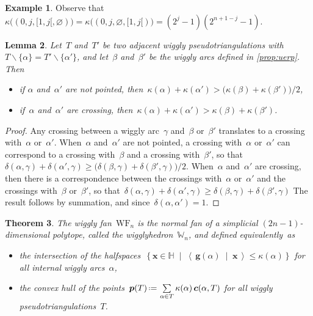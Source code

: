 \documentclass{amsart}
\newtheorem{theorem}{Theorem}%
\newtheorem{lemma}[theorem]{Lemma}
\theoremstyle{definition}
\newtheorem{example}[theorem]{Example}
\newcommand{\HH}{\mathbb{H}} %
\renewcommand{\b}[1]{{\boldsymbol{#1}}} %
\newcommand{\set}[2]{\left\{ #1 \;\middle|\; #2 \right\}} %
\newcommand{\ssm}{\smallsetminus} %
\newcommand{\dotprod}[2]{\left\langle \, #1 \; \middle| \; #2 \, \right\rangle} %
\newcommand{\eqdef}{\mbox{\,\raisebox{0.2ex}{\scriptsize\ensuremath{\mathrm:}}\ensuremath{=}\,}} %
\newcommand{\darkblue}{\color{darkblue}} %
\newcommand{\defn}[1]{\textsl{\darkblue #1}} %
\newcommand{\polytope}[1]{\mathds{#1}} %
\newcommand{\wigglyFan}{\mathrm{WF}} %
\newcommand{\wigglyhedron}{\polytope{W}} %
\begin{document}
\begin{example}
Observe that
$\kappa \big( (0, j, {[1,j[}, \varnothing) \big) 
= \kappa \big( (0, j, \varnothing, {[1,j[}) \big) 
= (2^j-1)(2^{n+1-j}-1)$.
\end{example}

\begin{lemma}
\label{lem:wallCrossingInequalities}
Let~$T$ and~$T'$ be two adjacent wiggly pseudotriangulations with~$T \ssm \{\alpha\} = T' \ssm \{\alpha'\}$, and let~$\beta$ and~$\beta'$ be the wiggly arcs defined in \cref{prop:uerp}.
Then
\begin{itemize}
\item if $\alpha$ and~$\alpha'$ are not pointed, then~$\kappa(\alpha) + \kappa(\alpha') > \big( \kappa(\beta) + \kappa(\beta') \big) / 2$,
\item if~$\alpha$ and~$\alpha'$ are crossing, then~${\kappa(\alpha) + \kappa(\alpha') > \kappa(\beta) + \kappa(\beta')}$.
\end{itemize}
\end{lemma}

\begin{proof}
Any crossing between a wiggly arc~$\gamma$ and~$\beta$ or~$\beta'$ translates to a crossing with~$\alpha$ or~$\alpha'$.
When~$\alpha$ and~$\alpha'$ are not pointed, a crossing with~$\alpha$ or~$\alpha'$ can correspond to a crossing with~$\beta$ and a crossing with~$\beta'$, so that~$\delta(\alpha, \gamma) + \delta(\alpha', \gamma) \ge \big( \delta(\beta, \gamma) + \delta(\beta', \gamma) \big) / 2$.
When~$\alpha$ and~$\alpha'$ are crossing, then there is a correspondence between the crossings with~$\alpha$ or~$\alpha'$ and the crossings with~$\beta$ or~$\beta'$, so that~$\delta(\alpha, \gamma) + \delta(\alpha', \gamma) \ge \delta(\beta, \gamma) + \delta(\beta', \gamma)$
The result follows by summation, and since~$\delta(\alpha, \alpha') = 1$.
\end{proof}

\begin{theorem}
\label{thm:wigglyhedron}
The wiggly fan~$\wigglyFan_n$ is the normal fan of a simplicial $(2n-1)$-dimensional polytope, called the \defn{wigglyhedron}~$\wigglyhedron_n$, and defined equivalently~as
\begin{itemize}
\item the intersection of the halfspaces~$\set{\b{x} \in \HH}{\dotprod{\b{g}(\alpha)}{\b{x}} \le \kappa(\alpha)}$ for all internal wiggly arcs~$\alpha$,
\item the convex hull of the points~$\b{p}(T) \eqdef \sum\limits_{\alpha \in T} \kappa(\alpha) \, \b{c}(\alpha, T)$ for all wiggly pseudotriangulations~$T$.
\end{itemize}
\end{theorem}
\end{document}
